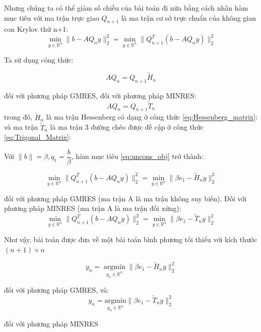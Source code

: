 \documentclass[14pt, a4paper]{article}
\numberwithin{equation}{section}
\numberwithin{algorithm}{section}
\numberwithin{figure}{section}
\numberwithin{dl}{section}
\numberwithin{md}{section}
\numberwithin{bd}{section}
\begin{document}
Nhưng chúng ta có thể giảm số chiều của bài toán đi nữa bằng cách nhân hàm mục tiêu với ma trận trực giao $Q_{n+1}$ là ma trận cơ sở trực chuẩn của không gian con Krylov thứ n+1:
\begin{equation} \min_{y \in \mathbb{R}^{n}}  \lVert b - AQ_n y \rVert_2^2 = \min_{y \in \mathbb{R}^{n}}  \lVert Q_{n+1}^T(b - AQ_n y) \rVert_2^2 \label{eq:uncons_obj}\end{equation}

Ta sử dụng công thức:

\begin{equation}
    AQ_n = Q_{n+1}\widetilde{H}_n
\end{equation}

đối với phương pháp GMRES, đối với phương pháp MINRES:
\begin{equation}
    AQ_n = Q_{n+1} \widetilde{T}_n
\end{equation}
trong đó, $\widetilde{H}_n$ là ma trận Hessenberg có dạng ở công thức \ref{eq:Hessenberg_matrix}:
và ma trận $\widetilde{T}_n$ là ma trận 3 đường chéo được đề cập ở công thức \ref{eq:Trigonal_Matrix}:

Với $\lVert b \rVert = \beta, q_1 = \dfrac{b}{\beta}$, hàm mục tiêu \eqref{eq:uncons_obj} trở thành:

\begin{equation}
    \min_{y \in \mathbb{R}^{n}}  \lVert Q_{n+1}^T(b - AQ_n y) \rVert_2^2=\min_{y \in \mathbb{R}^{n}} \lVert \beta e_1 - \widetilde{H}_n y\rVert_2^2
\end{equation}

đối với phương pháp GMRES (ma trận A là ma trận không suy biến).
Đối với phương pháp MINRES (ma trận A là ma trận đối xứng):
\begin{equation}
    \min_{y \in \mathbb{R}^{n}}  \lVert Q_{n+1}^T(b - AQ_n y) \rVert_2^2=\min_{y \in \mathbb{R}^{n}} \lVert \beta e_1 - \widetilde{T}_n y\rVert_2^2
\end{equation}

Như vậy, bài toán được đưa về một bài toán bình phương tối thiểu với kích thước $(n+1)\times n$

\begin{equation}
    y_n = \operatorname*{argmin}_{y_n \in \mathbb{R}^{n}} \lVert \beta e_1 - \widetilde{H}_n y\rVert_2^2
\end{equation}

đối với phương pháp GMRES, và:
\begin{equation}
    y_n = \underset{y_n \in \mathbb{R}^{n}}{\mathrm{argmin}} \lVert \beta e_1 - \widetilde{T}_n y\rVert_2^2
\end{equation}

đối với phương pháp MINRES


\newpage
{}
%
%
\pagestyle{plain}
\printbibliography[title={Tài liệu tham khảo}]

\end{document}

